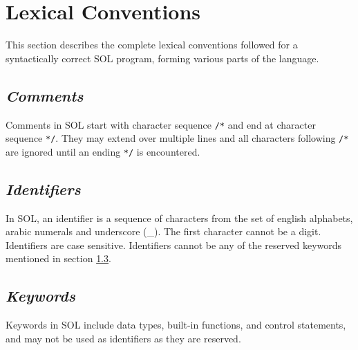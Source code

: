 \section{Lexical Conventions}

This section describes the complete lexical conventions followed for a syntactically correct SOL program, forming various parts of the language.

    \subsection{\textit{Comments}}
    Comments in SOL start with character sequence \texttt{/*} and end at character sequence \texttt{*/}. They may extend over multiple lines and all characters following \texttt{/*} are ignored until an ending \texttt{*/} is encountered.

    \subsection{\textit{Identifiers}}
    In SOL, an identifier is a sequence of characters from the set of english alphabets, arabic numerals and underscore (\_). The first character cannot be a digit. Identifiers are case sensitive. Identifiers cannot be any of the reserved keywords mentioned in section \ref{keywords}.

    \subsection{\textit{Keywords}} \label{keywords}
    Keywords in SOL include data types, built-in functions, and control statements, and may not be used as identifiers as they are reserved.

